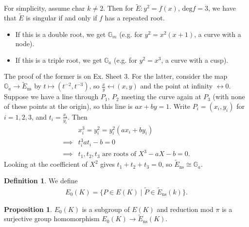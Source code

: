 \documentclass{article}
\theoremstyle{definition}
\newtheorem{prop}[theorem]{Proposition}
\newtheorem{defn}{Definition}[section]
\begin{document}
For simplicity, assume $\text{char }k \neq 2$. Then for $\widetilde{E} : y^2=f(x)$, $\text{deg}f=3$, we have that $\widetilde{E}$ is singular if and only if $f$ has a repeated root.
\begin{itemize}
    \item If this is a double root, we get $\mathbb{G}_m$ (e.g. for $y^2=x^2(x+1)$, a curve with a node).
    \item If this is a triple root, we get $\mathbb{G}_a$ (e.g. for $y^2=x^3$, a curve with a cusp).
\end{itemize}
The proof of the former is on Ex. Sheet 3. For the latter, consider the map $\mathbb{G}_a \to \widetilde{E}_{\text{ns}}$ by $t \mapsto (t^{-2},t^{-3})$, so $\frac{x}{y}\mapsfrom (x,y)$ and the point at infinity $\leftrightarrow 0$. Suppose we have a line through $P_1$, $P_2$ meeting the curve again at $P_3$ (with none of these points at the origin), so this line is $ax+by=1$. Write $P_i = (x_i,y_i)$ for $i =1,2,3$, and $t_i = \frac{x_i}{y_i}$. Then 
\begin{align*}
    &x_i^3=y_i^2=y_i^2(ax_i+by_i)\\
    \implies & t_i^3at_i-b=0\\
    \implies & t_1,t_2,t_3 \text{ are roots of }X^3-aX-b=0.
\end{align*}
Looking at the coefficient of $X^2$ gives $t_1+t_2+t_3=0$, so $\widetilde{E}_{\text{ns}} \cong \mathbb{G}_a$.
\begin{defn}
    We define
    \begin{align*}
        E_0(K) = \{P \in E(K) \mid \widetilde{P} \in \widetilde{E}_{\text{ns}}(k)\}.
    \end{align*}
\end{defn}
\begin{prop}\label{prop9.5}
    $E_0(K)$ is a subgroup of $E(K)$ and reduction mod $\pi$ is a surjective group homomorphism $E_0(K) \to \widetilde{E}_{\text{ns}}(K)$.
\end{prop}
\end{document}
